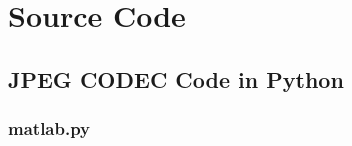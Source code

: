 \appendix

\begingroup

\chapter{Source Code}
\label{app:code}


\section{JPEG CODEC Code in Python}
\label{app:sec:python}

\subsection{matlab.py}



\endgroup
